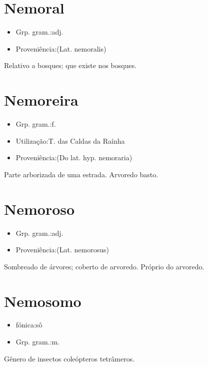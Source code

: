 \section{Nemoral}
\begin{itemize}
\item {Grp. gram.:adj.}
\end{itemize}
\begin{itemize}
\item {Proveniência:(Lat. \textunderscore nemoralis\textunderscore )}
\end{itemize}
Relativo a bosques; que existe nos bosques.
\section{Nemoreira}
\begin{itemize}
\item {Grp. gram.:f.}
\end{itemize}
\begin{itemize}
\item {Utilização:T. das Caldas da Raínha}
\end{itemize}
\begin{itemize}
\item {Proveniência:(Do lat. hyp. \textunderscore nemoraria\textunderscore )}
\end{itemize}
Parte arborizada de uma estrada.
Arvoredo basto.
\section{Nemoroso}
\begin{itemize}
\item {Grp. gram.:adj.}
\end{itemize}
\begin{itemize}
\item {Proveniência:(Lat. \textunderscore nemorosus\textunderscore )}
\end{itemize}
Sombreado de árvores; coberto de arvoredo.
Próprio do arvoredo.
\section{Nemosomo}
\begin{itemize}
\item {fónica:sô}
\end{itemize}
\begin{itemize}
\item {Grp. gram.:m.}
\end{itemize}
Gênero de insectos coleópteros tetrâmeros.
